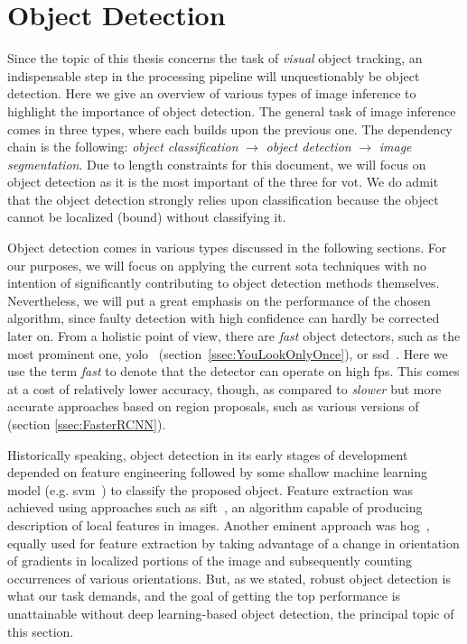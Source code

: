 \section{Object Detection}
\label{sec:ObjectDetection}

Since the topic of this thesis concerns the task of \emph{visual} object tracking, an indispensable step in the processing pipeline will unquestionably be object detection. Here we give an overview of various types of image inference to highlight the importance of object detection. The general task of image inference comes in three types, where each builds upon the previous one. The dependency chain is the following: \emph{object classification} $\to$ \emph{object detection} $\to$ \emph{image segmentation}. Due to length constraints for this document, we will focus on object detection as it is the most important of the three for \gls{vot}. We do admit that the object detection strongly relies upon classification because the object cannot be localized (bound) without classifying it.

Object detection comes in various types discussed in the following sections. For our purposes, we will focus on applying the current \gls{sota} techniques with no intention of significantly contributing to object detection methods themselves. Nevertheless, we will put a great emphasis on the performance of the chosen algorithm, since faulty detection with high confidence can hardly be corrected later on. From a holistic point of view, there are \emph{fast} object detectors, such as the most prominent one, \gls{yolo}~\cite{redmon2016yolo} (section~\ref{ssec:YouLookOnlyOnce}), or \gls{ssd}~\cite{liu2016ssd}. Here we use the term \emph{fast} to denote that the detector can operate on high \gls{fps}. This comes at a cost of relatively lower accuracy, though, as compared to \emph{slower} but more accurate approaches based on region proposals, such as various versions of \fasterrcnn{} (section \ref{ssec:FasterRCNN}).

Historically speaking, object detection in its early stages of development depended on feature engineering followed by some shallow machine learning model (e.g. \gls{svm}~\cite{cortes1995support}) to classify the proposed object. Feature extraction was achieved using approaches such as \gls{sift}~\cite{lowel1999objrecognition}, an algorithm capable of producing description of local features in images. Another eminent approach was \gls{hog}~\cite{mcconnell1986osti}, equally used for feature extraction by taking advantage of a change in orientation of gradients in localized portions of the image and subsequently counting occurrences of various orientations. But, as we stated, robust object detection is what our task demands, and the goal of getting the top performance is unattainable without deep learning-based object detection, the principal topic of this section.

